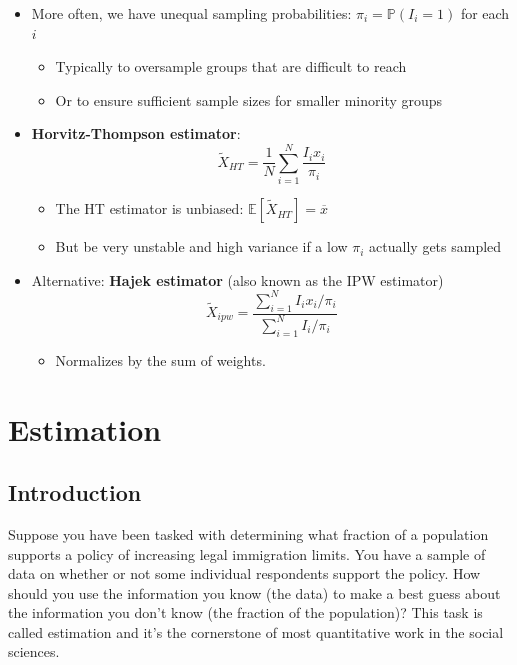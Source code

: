 \documentclass[
  letterpaper,
  DIV=11,
  numbers=noendperiod]{scrreprt}
\providecommand{\tightlist}{%
  \setlength{\itemsep}{0pt}\setlength{\parskip}{0pt}}\usepackage{longtable,booktabs,array}
\newcommand{\E}{\mathbb{E}}
\renewcommand{\P}{\mathbb{P}}
\theoremstyle{definition}
\theoremstyle{plain}
\theoremstyle{definition}
\theoremstyle{remark}
\begin{document}
\begin{itemize}
\item
  More often, we have unequal sampling probabilities:
  \(\pi_i = \P(I_{i} = 1)\) for each \(i\)

  \begin{itemize}
  \tightlist
  \item
    Typically to oversample groups that are difficult to reach
  \item
    Or to ensure sufficient sample sizes for smaller minority groups
  \end{itemize}
\item
  \textbf{Horvitz-Thompson estimator}: \[ 
  \widetilde{X}_{HT} = \frac{1}{N} \sum_{i=1}^{N} \frac{I_{i}x_{i}}{\pi_{i}}
  \]

  \begin{itemize}
  \tightlist
  \item
    The HT estimator is unbiased:
    \(\E[\widetilde{X}_{HT}] = \overline{x}\)
  \item
    But be very unstable and high variance if a low \(\pi_i\) actually
    gets sampled
  \end{itemize}
\item
  Alternative: \textbf{Hajek estimator} (also known as the IPW
  estimator) \[ 
  \widetilde{X}_{ipw} = \frac{\sum_{i=1}^N I_{i}x_{i} / \pi_{i}}{\sum_{i=1}^{N} I_{i}/\pi_{i}}
  \]

  \begin{itemize}
  \tightlist
  \item
    Normalizes by the sum of weights.
  \end{itemize}
\end{itemize}

\hypertarget{estimation}{%
\chapter{Estimation}\label{estimation}}

\hypertarget{introduction-2}{%
\section{Introduction}\label{introduction-2}}

Suppose you have been tasked with determining what fraction of a
population supports a policy of increasing legal immigration limits. You
have a sample of data on whether or not some individual respondents
support the policy. How should you use the information you know (the
data) to make a best guess about the information you don't know (the
fraction of the population)? This task is called estimation and it's the
cornerstone of most quantitative work in the social sciences.
\end{document}

